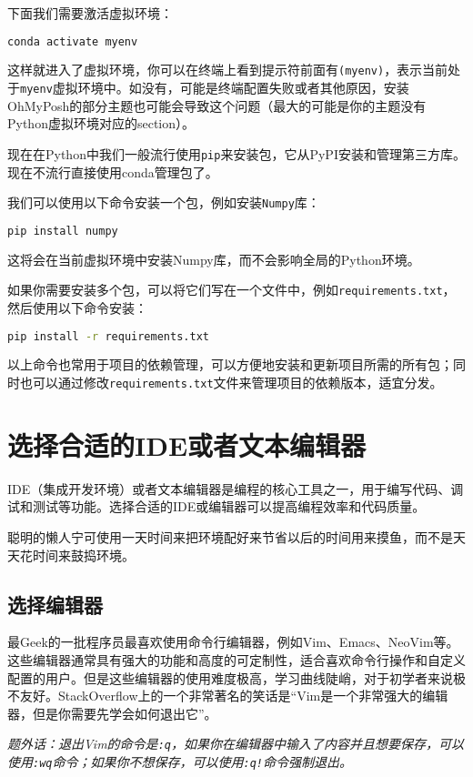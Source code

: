 \documentclass[../main.tex]{subfiles}
\begin{document}
下面我们需要激活虚拟环境：
\begin{lstlisting}[language=bash]
    conda activate myenv
\end{lstlisting}
这样就进入了虚拟环境，你可以在终端上看到提示符前面有\texttt{(myenv)}，表示当前处于\texttt{myenv}虚拟环境中。如没有，可能是终端配置失败或者其他原因，安装OhMyPosh的部分主题也可能会导致这个问题（最大的可能是你的主题没有Python虚拟环境对应的section）。

现在在Python中我们一般流行使用\texttt{pip}来安装包，它从PyPI安装和管理第三方库。现在不流行直接使用conda管理包了。

我们可以使用以下命令安装一个包，例如安装\texttt{Numpy}库：
\begin{lstlisting}[language=bash]
    pip install numpy
\end{lstlisting}
这将会在当前虚拟环境中安装Numpy库，而不会影响全局的Python环境。

如果你需要安装多个包，可以将它们写在一个文件中，例如\texttt{requirements.txt}，然后使用以下命令安装：
\begin{lstlisting}[language=bash]
    pip install -r requirements.txt
\end{lstlisting}
以上命令也常用于项目的依赖管理，可以方便地安装和更新项目所需的所有包；同时也可以通过修改\texttt{requirements.txt}文件来管理项目的依赖版本，适宜分发。

\section{选择合适的IDE或者文本编辑器}

IDE（集成开发环境）或者文本编辑器是编程的核心工具之一，用于编写代码、调试和测试等功能。选择合适的IDE或编辑器可以提高编程效率和代码质量。

聪明的懒人宁可使用一天时间来把环境配好来节省以后的时间用来摸鱼，而不是天天花时间来鼓捣环境。

\subsection{选择编辑器}

最Geek的一批程序员最喜欢使用命令行编辑器，例如Vim、Emacs、NeoVim等。这些编辑器通常具有强大的功能和高度的可定制性，适合喜欢命令行操作和自定义配置的用户。但是这些编辑器的使用难度极高，学习曲线陡峭，对于初学者来说极不友好。StackOverflow上的一个非常著名的笑话是“Vim是一个非常强大的编辑器，但是你需要先学会如何退出它”。

\textit{题外话：退出Vim的命令是\texttt{:q}，如果你在编辑器中输入了内容并且想要保存，可以使用\texttt{:wq}命令；如果你不想保存，可以使用\texttt{:q!}命令强制退出。}
\end{document}
